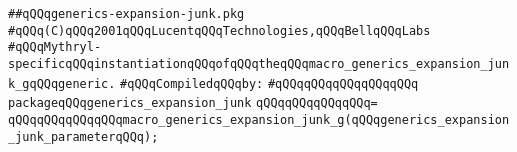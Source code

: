 \label{src/lib/compiler/front/semantic/modules/generics-expansion-junk.pkg}
\verb|##qQQqgenerics-expansion-junk.pkg|\newline
\verb|#qQQq(C)qQQq2001qQQqLucentqQQqTechnologies,qQQqBellqQQqLabs|\newline
\verb|#qQQqMythryl-specificqQQqinstantiationqQQqofqQQqtheqQQqmacro_generics_expansion_junk_gqQQqgeneric.|\newline
\newline
\verb|#qQQqCompiledqQQqby:|\newline
\verb|#qQQqqQQqqQQqqQQqqQQq|\newline
\newline
\verb|packageqQQqgenerics_expansion_junk|\newline
\verb|qQQqqQQqqQQqqQQq=|\newline
\verb|qQQqqQQqqQQqqQQqmacro_generics_expansion_junk_g(qQQqgenerics_expansion_junk_parameterqQQq);|\newline

